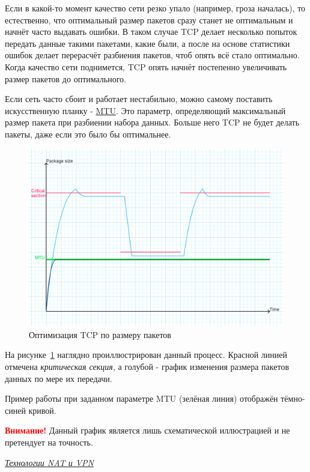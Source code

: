 Если в какой-то момент качество сети резко упало (например, гроза началась), то естественно, что оптимальный размер пакетов сразу станет не оптимальным и начнёт часто выдавать ошибки. В таком случае TCP делает несколько попыток передать данные такими пакетами, какие были, а после на основе статистики ошибок делает перерасчёт разбиения пакетов, чтоб опять всё стало оптимально. Когда качество сети поднимется, TCP опять начнёт постепенно увеличивать размер пакетов до оптимального.

Если сеть часто сбоит и работает нестабильно, можно самому поставить искусственную планку - \href{https://ru.wikipedia.org/wiki/Maximum_transmission_unit}{MTU}. Это параметр, определяющий максимальный размер пакета при разбиении набора данных. Больше него TCP не будет делать пакеты, даже если это было бы оптимальнее.

\begin{figure}[h]
	\centering
	\includegraphics[scale=0.5]{9/09_01.png}
	\caption{Оптимизация TCP по размеру пакетов}
	\label{fig:graph_9}
\end{figure}

На рисунке~\ref{fig:graph_9} наглядно проиллюстрирован данный процесс. Красной линией отмечена \textit{критическая секция}, а голубой - график изменения размера пакетов данных по мере их передачи.

Пример работы при заданном параметре MTU (зелёная линия) отображён тёмно-синей кривой.

\textcolor{red}{\textbf{Внимание!}} Данный график является лишь схематической иллюстрацией и не претендует на точность.

\begin{center}
	\textit{\underline{Технологии NAT и VPN}}
\end{center}

